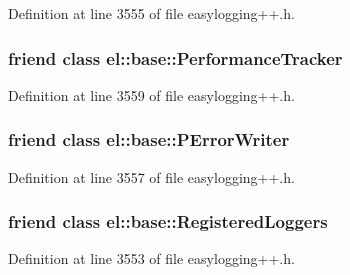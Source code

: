 Definition at line 3555 of file easylogging++.\+h.

\hypertarget{classel_1_1_logger_a6a4d7851e1984800be3c230f06a79528}{}
\subsubsection[{el\+::base\+::\+Performance\+Tracker}]{\setlength{\rightskip}{0pt plus 5cm}friend class {\bf el\+::base\+::\+Performance\+Tracker}\hspace{0.3cm}{\ttfamily [friend]}}\label{classel_1_1_logger_a6a4d7851e1984800be3c230f06a79528}


Definition at line 3559 of file easylogging++.\+h.

\hypertarget{classel_1_1_logger_a2a368b9be1b8d6a29d4bb92a11807f39}{}
\subsubsection[{el\+::base\+::\+P\+Error\+Writer}]{\setlength{\rightskip}{0pt plus 5cm}friend class {\bf el\+::base\+::\+P\+Error\+Writer}\hspace{0.3cm}{\ttfamily [friend]}}\label{classel_1_1_logger_a2a368b9be1b8d6a29d4bb92a11807f39}


Definition at line 3557 of file easylogging++.\+h.

\hypertarget{classel_1_1_logger_a574ecee25e8d578f76060a95a2fe7c9e}{}
\subsubsection[{el\+::base\+::\+Registered\+Loggers}]{\setlength{\rightskip}{0pt plus 5cm}friend class {\bf el\+::base\+::\+Registered\+Loggers}\hspace{0.3cm}{\ttfamily [friend]}}\label{classel_1_1_logger_a574ecee25e8d578f76060a95a2fe7c9e}


Definition at line 3553 of file easylogging++.\+h.

